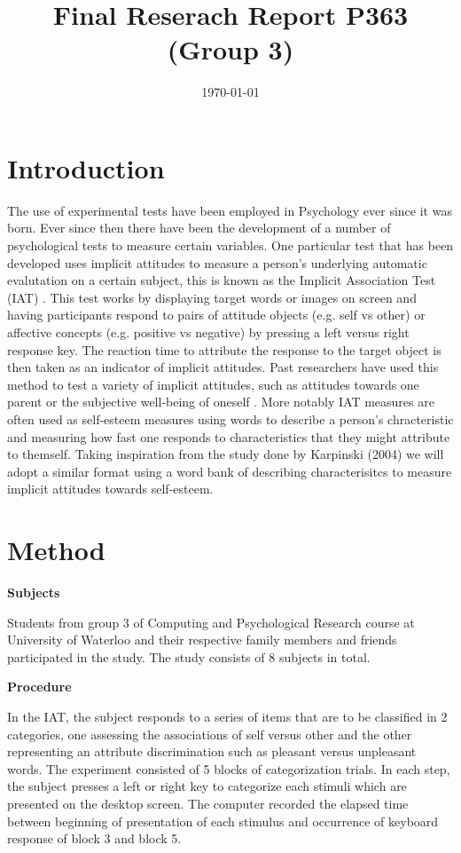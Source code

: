 \documentclass[11pt]{article}
\date{\today}
\title{Final Reserach Report P363 (Group 3)}
\begin{document}
\maketitle
\tableofcontents



\section{Introduction}
\label{sec:orge23f03d}

The use of experimental tests have been employed in Psychology ever since it was born. Ever since then there have been the development of a number of psychological tests to measure certain variables. One particular test that has been developed uses implicit attitudes to measure a person's underlying automatic evalutation on a certain subject, this is known as the Implicit Association Test (IAT) \cite{greenwald_mcghee_schwartz_1998}. This test works by displaying target words or images on screen and having participants respond to pairs of attitude objects (e.g. self vs other) or affective concepts (e.g. positive vs negative) by pressing a left versus right response key. The reaction time to attribute the response to the target object is then taken as an indicator of implicit attitudes. Past researchers have used this method to test a variety of implicit attitudes, such as attitudes towards one parent \cite{Yang_2013} or the subjective well-being of oneself \cite{Walker_Schimmack_2008}. More notably IAT measures are often used as self-esteem measures using words to describe a person's chracteristic and measuring how fast one responds to characteristics that they might attribute to themself. Taking inspiration from the study done by Karpinski (2004) we will adopt a similar format using a word bank of describing characterisitcs to measure implicit attitudes towards self-esteem. 

\section{Method}
\label{sec:org302da94}

\textbf{Subjects}

Students from group 3 of Computing and Psychological Research course at University of Waterloo and their respective family members and friends participated in the study. The study consists of 8 subjects in total. 

\textbf{Procedure}

In the IAT, the subject responds to a series of items that are to be classified in 2 categories, one assessing the associations of self versus other and the other representing an attribute discrimination such as pleasant versus unpleasant words. The experiment consisted of 5 blocks of categorization trials. In each step, the subject presses a left or right key to categorize each stimuli which are presented on the desktop screen. The computer recorded the elapsed time between beginning of presentation of each stimulus and occurrence of keyboard response of block 3 and block 5.
\end{document}

